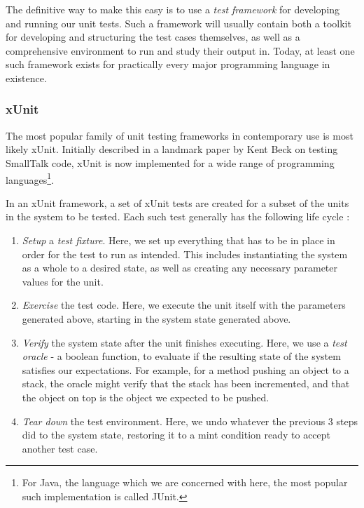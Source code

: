 \documentclass{article}
\newcommand{\tmem}[1]{{\em #1\/}}
\newcommand{\tmtextit}[1]{{\itshape{#1}}}
\newenvironment{enumeratenumeric}{\begin{enumerate}[1.] }{\end{enumerate}}
\begin{document}
The definitive way to make this easy is to use a {\tmem{test framework}} for
developing and running our unit tests. Such a framework will usually contain
both a toolkit for developing and structuring the test cases themselves, as
well as a comprehensive environment to run and study their output in. Today,
at least one such framework exists for practically every major programming
language in existence.



\subsubsection{xUnit}

The most popular family of unit testing frameworks in contemporary use is
most likely xUnit. Initially described in a landmark paper by Kent Beck
{\cite{Beck1989}} on testing SmallTalk code, xUnit is now implemented for a
wide range of programming languages{\footnote{For Java, the language which we
are concerned with here, the most popular such implementation is called
JUnit.}}.



In an xUnit framework, a set of xUnit tests are created for a subset of the
units in the system to be tested. Each such test generally has the following
life cycle {\cite{TestPatterns2007}}:
\begin{enumeratenumeric}
  \item \tmtextit{Setup} a \tmtextit{test fixture}. Here, we set up everything
  that has to be in place in order for the test to run as intended. This
  includes instantiating the system as a whole to a desired state, as well as
  creating any necessary parameter values for the unit. \
  
  \item \tmtextit{Exercise} the test code. Here, we execute the unit itself
  with the parameters generated above, starting in the system state generated
  above.
  
  \item \tmtextit{Verify} the system state after the unit finishes executing.
  Here, we use a \tmtextit{test oracle} - a boolean function, to evaluate if
  the resulting state of the system satisfies our expectations. For example,
  for a method pushing an object to a stack, the oracle might verify that the
  stack has been incremented, and that the object on top is the object we
  expected to be pushed. \
  
  \item \tmtextit{Tear down} the test environment. Here, we undo whatever the
  previous 3 steps did to the system state, restoring it to a mint condition
  ready to accept another test case.
\end{enumeratenumeric}
\end{document}
